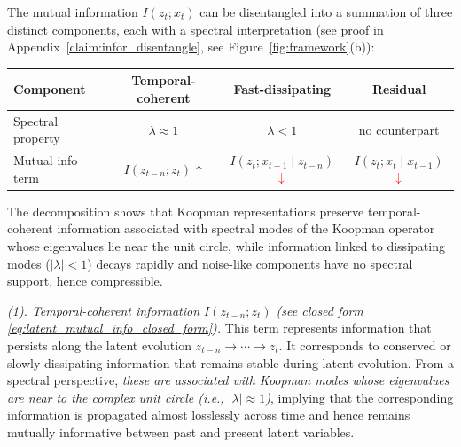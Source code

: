 \documentclass{article} %
\begin{document}
\begin{claimwithframe} \label{KL3}
The mutual information $I(z_t; x_t)$ can be disentangled into a summation of three distinct components, each with a spectral interpretation (see proof in Appendix~\ref{claim:infor_disentangle}, see Figure~\ref{fig:framework}(b)):
\vspace{-1em}
\begin{center}
\renewcommand{\arraystretch}{0.8}
\setlength{\tabcolsep}{4pt}
\footnotesize   %
\begin{tabular}{@{} l | c c c @{}}
\toprule
\textbf{Component} 
& \color{slowcolor} Temporal-coherent 
& \color{confoundcolor} Fast-dissipating 
& \color{confoundcolor} Residual \\
\midrule
Spectral property 
& {\color{slowcolor}$ \lambda \!\approx\! 1 $ } 
& {\color{confoundcolor}$\lambda <\! 1$} 
& {\color{confoundcolor} no counterpart} \\
Mutual info term 
& \colorbox{softblue}{$I(z_{t-n}; z_t)$ } \color{slowcolor} $\huge\uparrow$
 
& \colorbox{softred}{$I(z_t; x_{t-1} \mid z_{t-n})$}  $\textcolor{red}{\huge\downarrow}$
& \colorbox{softred}{$I(z_t; x_t \mid x_{t-1})$} $\textcolor{red}{\huge\downarrow}$ \\ 
\bottomrule
\end{tabular}
\end{center}
The decomposition shows that Koopman representations preserve temporal-coherent information associated with spectral modes of the Koopman operator whose eigenvalues lie near the unit circle, while information linked to dissipating modes ($|\lambda|<1$) decays rapidly and noise-like components have no spectral support, hence compressible.
\end{claimwithframe}



\textit{(1). Temporal-coherent information $I(z_{t-n}; z_t)$ (see closed form \eqref{eq:latent_mutual_info_closed_form}).}  This term represents information that persists along the latent evolution $z_{t-n} \to \cdots \to z_{t}$. It corresponds to conserved or slowly dissipating information that remains stable during latent evolution. From a spectral perspective, \textit{these are associated with Koopman modes whose eigenvalues are near to the complex unit circle (i.e., $|\lambda| \approx 1$)}, implying that the corresponding information is propagated almost losslessly across time and hence remains mutually informative between past and present latent variables.
\end{document}
